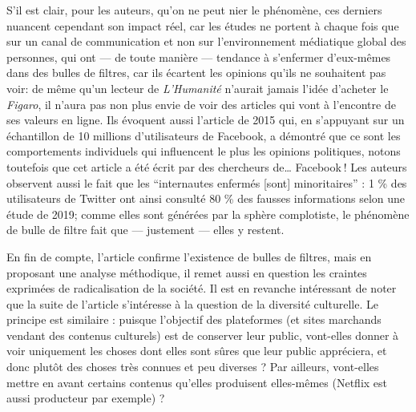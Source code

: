 S’il est clair, pour les auteurs, qu’on ne peut nier le phénomène, ces derniers nuancent cependant son impact réel, car les études ne portent à chaque fois que sur un canal de communication et non sur l’environnement médiatique global des personnes, qui ont — de toute manière — tendance à s’enfermer d’eux-mêmes dans des bulles de filtres, car ils écartent les opinions qu’ils ne souhaitent pas voir: de même qu’un lecteur de \textit{L’Humanité} n’aurait jamais l’idée d’acheter le \textit{Figaro}, il n’aura pas non plus envie de voir des articles qui vont à l’encontre de ses valeurs en ligne. Ils évoquent aussi l’article de 2015 qui, en s’appuyant sur un échantillon de 10 millions d’utilisateurs de Facebook, a démontré que ce sont les comportements individuels qui influencent le plus les opinions politiques, notons toutefois que cet article a été écrit par des chercheurs de… Facebook ! Les auteurs observent aussi le fait que les \enquote{internautes enfermés [sont] minoritaires} : 1 \% des utilisateurs de Twitter ont ainsi consulté 80 \% des fausses informations selon une étude de 2019; comme elles sont générées par la sphère complotiste, le phénomène de bulle de filtre fait que — justement — elles y restent.

En fin de compte, l’article confirme l’existence de bulles de filtres, mais en proposant une analyse méthodique, il remet aussi en question les craintes exprimées de radicalisation de la société. Il est en revanche intéressant de noter que la suite de l’article s’intéresse à la question de la diversité culturelle. Le principe est similaire : puisque l’objectif des plateformes (et sites marchands vendant des contenus culturels) est de conserver leur public, vont-elles donner à voir uniquement les choses dont elles sont sûres que leur public appréciera, et donc plutôt des choses très connues et peu diverses ? Par ailleurs, vont-elles mettre en avant certains contenus qu’elles produisent elles-mêmes (Netflix est aussi producteur par exemple) ?

